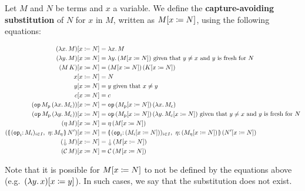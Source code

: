 \begin{definition}
  Let $M$ and $N$ be terms and $x$ a variable. We define the
  \textbf{capture-avoiding substitution}
  of $N$ for $x$ in $M$, written as $M[x \coloneqq N]$, using the following
  equations:

  \begin{align*}
    \subst{(\lam{x}{M})}{x}{N} &= \lam{x}{M} \\
    \subst{(\lam{y}{M})}{x}{N} &= \lam{y}{(\subst{M}{x}{N})} \textrm{ given
      that } y \neq x \textrm{ and $y$ is fresh for $N$} \\
    \subst{(\ap{M}{K})}{x}{N} &= \ap{(\subst{M}{x}{N})}{(\subst{K}{x}{N})} \\
    \subst{x}{x}{N} &= N \\
    \subst{y}{x}{N} &= y \textrm{ given that } x \neq y \\
    \subst{c}{x}{N} &= c \\
    \subst{(\app{\op{op}}{M_\petitp}{(\lam{x}{M_\petitc})})}{x}{N} &= \app{\op{op}}
      {(\subst{M_\petitp}{x}{N})}{(\lam{x}{M_\petitc})} \\
    \subst{(\app{\op{op}}{M_\petitp}{(\lam{y}{M_\petitc})})}{x}{N} &= \app{\op{op}}
      {(\subst{M_\petitp}{x}{N})}{(\lam{y}{\subst{M_\petitc}{x}{N}})}
      \textrm{ given that } y \neq x \textrm{ and $y$ is fresh for $N$} \\
    \subst{(\ap{\eta}{M})}{x}{N} &= \ap{\eta}{(\subst{M}{x}{N})} \\
    \subst{(\ap{\cibanana}{N'})}{x}{N} &= \ap{\banana{(\onto{\op{op}_i}
      (\subst{M_i}{x}{N}))_{i \in I},\ \onto{\eta} (\subst{M_\eta}{x}{N})}}
      {(\subst{N'}{x}{N})} \\
    \subst{(\ap{\cherry}{M})}{x}{N} &= \ap{\cherry}{(\subst{M}{x}{N})} \\
    \subst{(\ap{\CC}{M})}{x}{N} &= \ap{\CC}{(\subst{M}{x}{N})}
  \end{align*}

  Note that it is possible for $M[x \coloneqq N]$ to not be defined by the
  equations above (e.g.\ $(\lambda y.\, x)[x \coloneqq y]$). In such cases, we
  say that the substitution does not exist.
\end{definition}


